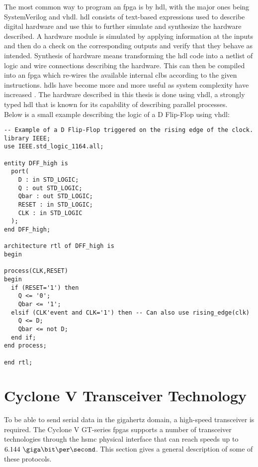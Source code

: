 \documentclass[main.tex]{subfiles}
\begin{document}
The most common way to program an \gls{fpga} is by \gls{hdl}, with the major ones being SystemVerilog and \acrshort{vhdl}. \Gls{hdl} consists of text-based expressions used to describe digital hardware and use this to further simulate and synthesize the hardware described. A hardware module is simulated by applying information at the inputs and then do a check on the corresponding outputs and verify that they behave as intended. Synthesis of hardware means transforming the \gls{hdl} code into a netlist of logic and wire connections describing the hardware. This can then be compiled into an \gls{fpga} which re-wires the available internal \glspl{clb} according to the given instructions. \glspl{hdl} have become more and more useful as system complexity have increased \cite{weste11}. The hardware described in this thesis is done using \acrshort{vhdl}, a strongly typed \gls{hdl} that is known for its capability of describing parallel processes.\\ 

Below is a small example describing the logic of a D Flip-Flop using \acrshort{vhdl}:


\begin{lstlisting}[frame=single] 
-- Example of a D Flip-Flop triggered on the rising edge of the clock.
library IEEE; 
use IEEE.std_logic_1164.all; 
 
entity DFF_high is 
  port( 
    D : in STD_LOGIC; 
    Q : out STD_LOGIC; 
    Qbar : out STD_LOGIC; 
    RESET : in STD_LOGIC; 
    CLK : in STD_LOGIC 
  ); 
end DFF_high; 
 
architecture rtl of DFF_high is 
begin 
 
process(CLK,RESET) 
begin 
  if (RESET='1') then 
    Q <= '0'; 
    Qbar <= '1'; 
  elsif (CLK'event and CLK='1') then -- Can also use rising_edge(clk)
    Q <= D; 
    Qbar <= not D; 
  end if; 
end process;
  
end rtl; 
\end{lstlisting}


\section{Cyclone V Transceiver Technology}

To be able to send serial data in the gigahertz domain, a high-speed transceiver is required. The Cyclone V GT-series \glspl{fpga} supports a number of transceiver technologies through the \gls{hsmc} physical interface that can reach speeds up to $6.144\ \giga\bit\per\second$. This section gives a general description of some of these protocols.
\end{document}
